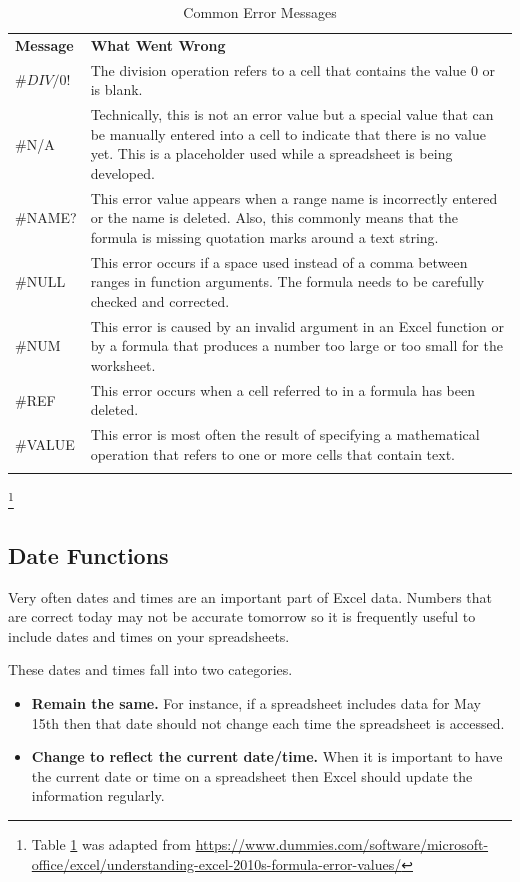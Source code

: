 {\small
	\begin{longtable}{p{0.75in}p{3.50in}} %
		\textbf{Message} & \textbf{What Went Wrong} \endhead
		\hline \\
		$ \#DIV/0! $ & The division operation refers to a cell that contains the value $ 0 $ or is blank.\\
		\#N/A & Technically, this is not an error value but a special value 		that can be manually entered into a cell to indicate that there is no value yet. This is a placeholder used while a spreadsheet is being developed.\\
		\#NAME? & This error value appears when a range name is incorrectly entered or the name is deleted. Also, this commonly means that the formula is missing quotation marks around a text string.\\
		\#NULL & This error occurs if a space used instead of a comma between ranges in function arguments. The formula needs to be carefully checked and corrected.\\
		\#NUM & This error is caused by an invalid argument in an Excel	function or by a formula that produces a number too large or too small for the worksheet.\\
		\#REF & This error occurs when a cell referred to in a formula has been deleted.\\
		\#VALUE & This error is most often the result of specifying a mathematical operation that refers to one or more cells that contain text.\\
		\caption{Common Error Messages}
		\label{03:tab01}
	\end{longtable}
}

\footnote{Table \ref{03:tab01} was adapted from  \url{https://www.dummies.com/software/microsoft-office/excel/understanding-excel-2010s-formula-error-values/}}

\subsection{Date Functions}

Very often dates and times are an important part of Excel data. Numbers that are correct today may not be accurate tomorrow so it is frequently useful to include dates and times on your spreadsheets.

These dates and times fall into two categories.

\begin{itemize}
	\item \textbf{Remain the same.} For instance, if a spreadsheet includes data for May 15th then that date should not change each time the spreadsheet is accessed.
	\item \textbf{Change to reflect the current date/time.} When it is important to have the current date or time on a spreadsheet then Excel should update the information regularly.
\end{itemize}

